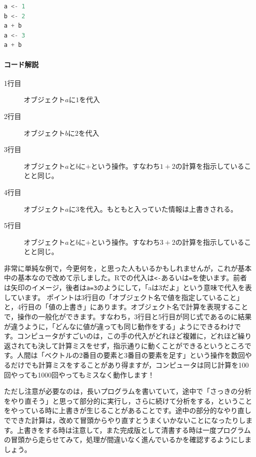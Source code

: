 \documentclass{ltjsbook}
\begin{document}
\begin{lstlisting}[language=c++,label={code:16_12},caption={代入操作}]
a <- 1
b <- 2
a + b
a <- 3
a + b
\end{lstlisting}

\paragraph{コード解説}
\begin{description}
	\item[1行目] オブジェクト$a$に$1$を代入
	\item[2行目] オブジェクト$b$に$2$を代入
	\item[3行目] オブジェクト$a$と$b$に$+$という操作。すなわち$1+2$の計算を指示していることと同じ。
	\item[4行目] オブジェクト$a$に$3$を代入。もともと入っていた情報は上書きされる。
	\item[5行目] オブジェクト$a$と$b$に$+$という操作。すなわち$3+2$の計算を指示していることと同じ。
\end{description}

非常に単純な例で，今更何を，と思った人もいるかもしれませんが，これが基本中の基本なので改めて示しました。Rでの代入は\verb|<-|あるいは\verb|=|を使います。前者は矢印のイメージ，後者は\verb|a=3|のようにして，「aは3だよ」という意味で代入を表しています。
ポイントは3行目の「オブジェクト名で値を指定していること」と，4行目の「値の上書き」にあります。オブジェクト名で計算を表現することで，操作の一般化ができます。すなわち，3行目と5行目が同じ式であるのに結果が違うように，「どんなに値が違っても同じ動作をする」ようにできるわけです。コンピュータがすごいのは，この手の代入がどれほど複雑に，どれほど繰り返されても決して計算ミスをせず，指示通りに動くことができるというところです。人間は「ベクトルの2番目の要素と3番目の要素を足す」という操作を数回やるだけでも計算ミスをすることがあり得ますが，コンピュータは同じ計算を100回やっても1000回やってもミスなく動作します！

ただし注意が必要なのは，長いプログラムを書いていて，途中で「さっきの分析をやり直そう」と思って部分的に実行し，さらに続けて分析をする，ということをやっている時に上書きが生じることがあることです。途中の部分的なやり直しでできた計算は，改めて冒頭からやり直すとうまくいかないことになったりします。上書きをする時は注意して，また完成版として清書する時は一度プログラムの冒頭から走らせてみて，処理が間違いなく進んでいるかを確認するようにしましょう。
\end{document}
